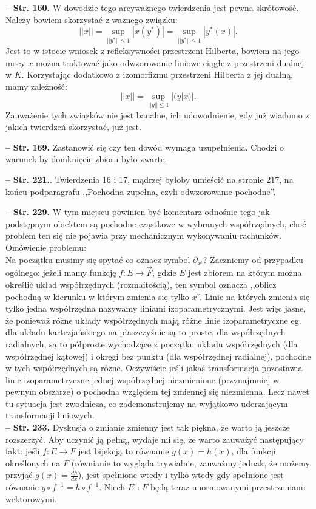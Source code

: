 \documentclass[a4paper]{article}
\newcommand{\tb}{\textbf}
\newcommand{\noi}{\noindent}
\newcommand{\start}{\noi \tb{--} {}}
\newcommand{\Str}[1]{\tb{Str. #1.}}
\begin{document}
\start \Str{160} W dowodzie tego arcyważnego twierdzenia jest pewna
skrótowość. Należy bowiem skorzystać z ważnego związku:
$$|| x || = \sup_{ || y^{ * } || \leq1 } | x( y^{ * } ) | = \sup_{ || y^{ * } || \leq1 } | y^{ * }( x ) | \textrm{.}$$
Jest to w istocie wniosek z refleksywności przestrzeni Hilberta,
bowiem na jego mocy $x$ można traktować jako odwzorowanie liniowe
ciągłe z przestrzeni dualnej w $K$. Korzystając dodatkowo z
izomorfizmu przestrzeni Hilberta z jej dualną, mamy \linebreak
zależność:
$$|| x || = \sup_{ || y || \leq 1 } | ( y | x ) | \textrm{.}$$
Zauważenie tych związków nie jest banalne, ich udowodnienie, gdy już
wiadomo z jakich twierdzeń skorzystać, już jest.

\start \Str{169} Zastanowić się czy ten dowód wymaga uzupełnienia.
Chodzi o warunek by domknięcie zbioru było zwarte.

\start \Str{221}. Twierdzenia 16 i 17, mądrzej byłoby umieścić na
stronie 217, na końcu podparagrafu ,,Pochodna zupełna, czyli
odwzorowanie pochodne''.
  
\start \Str{229} W tym miejscu powinien być komentarz odnośnie tego
jak podstępnym obiektem są pochodne cząstkowe w wybranych
współrzędnych, choć problem ten się nie pojawia przy mechanicznym
wykonywaniu rachunków.
Omówienie problemu: \\
Na początku musimy się spytać co oznacz symbol $\partial_{ x^{ i } }$?
Zaczniemy od przypadku ogólnego: jeżeli mamy funkcję
$f : E \rightarrow \vec{ F }$, gdzie $E$ jest zbiorem na którym można
określić układ współrzędnych (rozmaitością), ten symbol oznacza
,,oblicz pochodną w kierunku w którym zmienia się tylko $x$''. Linie
na których zmienia się tylko jedna współrzędna nazywamy liniami
izoparametrycznymi. Jest więc jasne, że ponieważ różne układy
współrzędnych mają różne linie izoparametryczne eg. dla układu
kartezjańskiego na płaszczyźnie są to proste, dla współrzędnych
radialnych, są to półproste wychodzące z początku układu współrzędnych
(dla współrzędnej kątowej) i okręgi bez punktu (dla współrzędnej
radialnej), pochodne w tych współrzędnych są różne. Oczywiście jeśli
jakaś transformacja pozostawia linie izoparametryczne jednej
współrzędnej niezmienione (przynajmniej w pewnym obszarze) o pochodna
względem tej zmiennej się niezmienna. Lecz nawet tu sytuacja jest
zwodnicza, co zademonstrujemy na wyjątkowo uderzającym
transformacji liniowych.\\

\start \Str{233} Dyskusja o zmianie zmienny jest tak piękna, że warto
ją jeszcze rozszerzyć. Aby uczynić ją pełną, wydaje mi się, że warto
zauważyć następujący fakt: jeśli $f : E \rightarrow F$ jest bijekcją
to równanie $ g( x ) = h( x ) $, dla funkcji określonych na $F$
(równianie to wygląda trywialnie, zauważmy jednak, że możemy przyjąć
$g( x ) = \frac{ d h }{ d x }$), jest spełnione wtedy i tylko wtedy
gdy spełnione jest równanie $g \circ f^{ -1 } = h \circ f^{ -1 }$.
Niech $E$ i $F$ będą teraz unormowanymi przestrzeniami wektorowymi.
\end{document}
